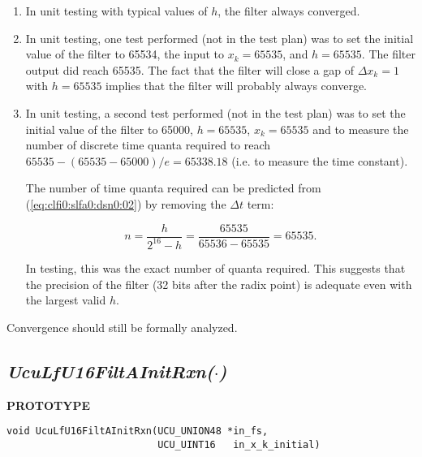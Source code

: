 \begin{enumerate}
\item In unit testing with typical values of $h$, the filter always converged.
\item In unit testing, one test performed (not in the test plan) was to set
      the initial value of the filter to 65534, the input to $x_k=65535$, and 
      $h=65535$.  The filter output did reach 65535.  The fact that the filter
      will close a gap of $\Delta x_k = 1$ with $h=65535$ implies that the filter will probably
      always converge.
\item In unit testing, a second test performed (not in the test plan) was to
      set the initial value of the filter to 65000, $h=65535$,
      $x_k = 65535$ and to measure the number of discrete time
      quanta required to reach $65535 - (65535-65000)/e = 65338.18$ (i.e.
      to measure the time constant).

      The number of time quanta required can be predicted from
      (\ref{eq:clfi0:slfa0:dsn0:02}) by removing the $\Delta t$ term:

      \begin{equation}
      \label{eq:clfi0:slfa0:dsn0:20}
      n = \frac{h}{2^{16} - h} = \frac{65535}{65536-65535} = 65535.
      \end{equation}

      In testing, this was the exact number of quanta required.  This suggests
      that the precision of the filter (32 bits after the radix point) is
      adequate even with the largest valid $h$.
\end{enumerate}

Convergence should still be formally analyzed.


\subsection[\emph{UcuLfU16FiltAInitRxn(\protect\mbox{\protect$\cdot$})}]
           {\emph{UcuLfU16FiltAInitRxn(\protect\mbox{\protect\boldmath $\cdot$})}}
\label{clfi0:slai0}

%

\noindent\textbf{PROTOTYPE}
\begin {list}{}{\setlength{\leftmargin}{0.25in}\setlength{\topsep}{0.0in}}
\item
\begin{verbatim}
void UcuLfU16FiltAInitRxn(UCU_UNION48 *in_fs,
                          UCU_UINT16   in_x_k_initial)
\end{verbatim}
\end{list}
\vspace{2.8ex}

